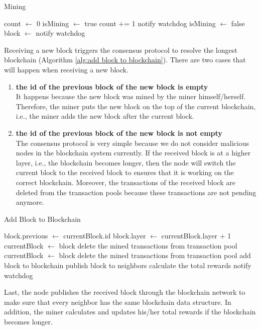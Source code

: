 \begin{algorithm}[htb]
    \caption{Mining}
    \label{alg:mining}
\begin{algorithmic}[1]
    \State count $\gets$ 0
    \State isMining $\gets$ true
    \State
    \Repeat 
    \State count += 1
    \State notify watchdog
    \State
    \State isMining $\gets$ false
    \State block $\gets$ 
    \State {}
    \State notify watchdog
    \EndProcedure
\end{algorithmic}
\end{algorithm}

\clearpage

Receiving a new block triggers the consensus protocol to resolve the longest blockchain (Algorithm \ref{alg:add block to blockchain}). There are two cases that will happen when receiving a new block.

\begin{enumerate}
    \item \textbf{the id of the previous block of the new block is empty} \\
        It happens because the new block was mined by the miner himself/herself. Therefore, the miner puts the new block on the top of the current blockchain, i.e., the miner adds the new block after the current block.
    \item \textbf{the id of the previous block of the new block is not empty} \\
        The consensus protocol is very simple because we do not consider malicious nodes in the blockchain system currently. If the received block is at a higher layer, i.e., the blockchain becomes longer, then the node will switch the current block to the received block to ensures that it is working on the correct blockchain. Moreover, the transactions of the received block are deleted from the transaction pools because these transactions are not pending anymore.
\end{enumerate}

\begin{algorithm}[htb]
    \caption{Add Block to Blockchain}
    \label{alg:add block to blockchain}
\begin{algorithmic}[1]
        \State block.previous $\gets$ currentBlock.id
        \State block.layer $\gets$ currentBlock.layer + 1
        \State currentBlock $\gets$ block
        \State delete the mined transactions from transaction pool
        \State currentBlock $\gets$ block
        \State delete the mined transactions from transaction pool
    \EndIf
    \State
    \State add block to blockchain
    \State publish block to neighbors
    \State calculate the total rewards
    \State notify watchdog
    \EndProcedure
\end{algorithmic}
\end{algorithm}

Last, the node publishes the received block through the blockchain network to make sure that every neighbor has the same blockchain data structure. In addition, the miner calculates and updates his/her total rewards if the blockchain becomes longer.



